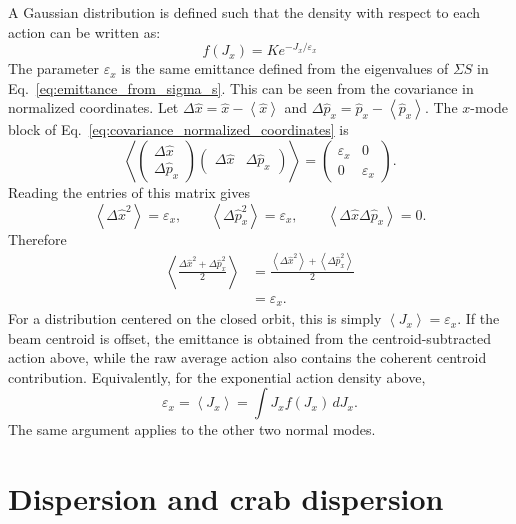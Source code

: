 A Gaussian distribution is defined such that the density with respect to each action can be written as:
\begin{equation}
f(J_x) = K e^{-J_x/\varepsilon_x}
\end{equation}
The parameter $\varepsilon_x$ is the same emittance defined from the eigenvalues
of $\Sigma S$ in Eq.~\ref{eq:emittance_from_sigma_s}. This can be seen from the
covariance in normalized coordinates. Let
$\Delta\hat{x}=\hat{x}-\left<\hat{x}\right>$ and
$\Delta\hat{p}_x=\hat{p}_x-\left<\hat{p}_x\right>$. The $x$-mode block of
Eq.~\ref{eq:covariance_normalized_coordinates} is
\begin{equation}
\left<
\left(\begin{array}{c}
\Delta\hat{x}\\
\Delta\hat{p}_x
\end{array}\right)
\left(\begin{array}{cc}
\Delta\hat{x} & \Delta\hat{p}_x
\end{array}\right)
\right>
=
\left(\begin{array}{cc}
\varepsilon_x & 0\\
0 & \varepsilon_x
\end{array}\right).
\end{equation}
Reading the entries of this matrix gives
\begin{equation}
\left<\Delta\hat{x}^2\right> = \varepsilon_x,\qquad
\left<\Delta\hat{p}_x^2\right> = \varepsilon_x,\qquad
\left<\Delta\hat{x}\Delta\hat{p}_x\right> = 0.
\end{equation}
Therefore
\begin{align}
\left<\frac{\Delta\hat{x}^2+\Delta\hat{p}_x^2}{2}\right>
&= \frac{\left<\Delta\hat{x}^2\right>
+\left<\Delta\hat{p}_x^2\right>}{2}\nonumber\\
&= \varepsilon_x.
\end{align}
For a distribution centered on the closed orbit, this is simply
$\left<J_x\right>=\varepsilon_x$. If the beam centroid is offset, the emittance
is obtained from the centroid-subtracted action above, while the raw average
action also contains the coherent centroid contribution.
Equivalently, for the exponential action density above,
\begin{equation}
\varepsilon_x = \left<J_x\right> = \int J_x f(J_x) \,dJ_x.
\end{equation}
The same argument applies to the other two normal modes.


\section{Dispersion and crab dispersion}
\label{opt:sec:dispersion_crab_dispersion}

